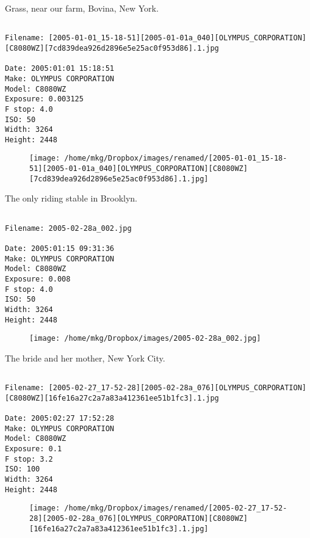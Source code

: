 \clearpage
\onecolumn
\noindent Grass, near our farm, Bovina, New York.
\noindent
\begin{lstlisting}

Filename: [2005-01-01_15-18-51][2005-01-01a_040][OLYMPUS_CORPORATION][C8080WZ][7cd839dea926d2896e5e25ac0f953d86].1.jpg

Date: 2005:01:01 15:18:51
Make: OLYMPUS CORPORATION
Model: C8080WZ
Exposure: 0.003125
F stop: 4.0
ISO: 50
Width: 3264
Height: 2448
\end{lstlisting}
\clearpage

\begin{figure}
\texttt{[image: /home/mkg/Dropbox/images/renamed/[2005-01-01\_15-18-51][2005-01-01a\_040][OLYMPUS\_CORPORATION][C8080WZ][7cd839dea926d2896e5e25ac0f953d86].1.jpg]}
\end{figure}
    
\clearpage
\onecolumn
\noindent The only riding stable in Brooklyn.
\noindent
\begin{lstlisting}

Filename: 2005-02-28a_002.jpg

Date: 2005:01:15 09:31:36
Make: OLYMPUS CORPORATION
Model: C8080WZ
Exposure: 0.008
F stop: 4.0
ISO: 50
Width: 3264
Height: 2448
\end{lstlisting}
\clearpage

\begin{figure}
\texttt{[image: /home/mkg/Dropbox/images/2005-02-28a\_002.jpg]}
\end{figure}
    
\clearpage
\onecolumn
\noindent The bride and her mother, New York City.
\noindent
\begin{lstlisting}

Filename: [2005-02-27_17-52-28][2005-02-28a_076][OLYMPUS_CORPORATION][C8080WZ][16fe16a27c2a7a83a412361ee51b1fc3].1.jpg

Date: 2005:02:27 17:52:28
Make: OLYMPUS CORPORATION
Model: C8080WZ
Exposure: 0.1
F stop: 3.2
ISO: 100
Width: 3264
Height: 2448
\end{lstlisting}
\clearpage

\begin{figure}
\texttt{[image: /home/mkg/Dropbox/images/renamed/[2005-02-27\_17-52-28][2005-02-28a\_076][OLYMPUS\_CORPORATION][C8080WZ][16fe16a27c2a7a83a412361ee51b1fc3].1.jpg]}
\end{figure}
    
